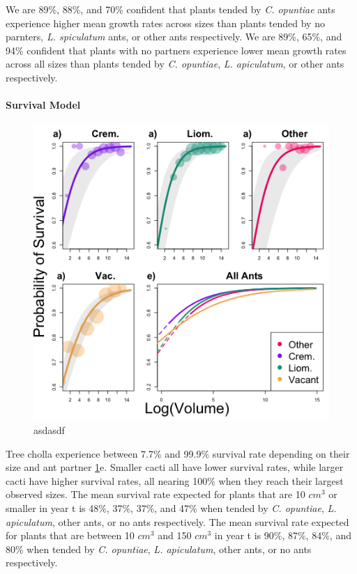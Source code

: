 \documentclass[11pt]{article}
\begin{document}
We are 89\%, 88\%, and 70\% confident that plants tended by \textit{C. opuntiae} ants experience higher mean growth rates across sizes than plants tended by no parnters, \textit{L. spiculatum} ants, or other ants respectively.
We are 89\%, 65\%, and 94\% confident that plants with no partners experience lower mean growth rates across all sizes than plants tended by \textit{C. opuntiae}, \textit{L. apiculatum}, or other ants respectively.

\paragraph{Survival Model}
\begin{figure}[H]
	\includegraphics[width=0.95\linewidth]{Figures/SurvivalPlot.png}
	\caption{asdasdf}
	\label{fig:surv}
\end{figure}
Tree cholla experience between 7.7\% and 99.9\% survival rate depending on their size and ant partner \ref{fig:surv}e.
Smaller cacti all have lower survival rates, while larger cacti have higher survival rates, all nearing 100\% when they reach their largest observed sizes.
The mean survival rate expected for plants that are 10 $cm^3$ or smaller in year t is 48\%, 37\%, 37\%, and 47\% when tended by \textit{C. opuntiae}, \textit{L. apiculatum}, other ants, or no ants respectively. 
The mean survival rate expected for plants that are between 10 $cm^3$ and 150 $cm^3$ in year t is 90\%, 87\%, 84\%, and 80\% when tended by \textit{C. opuntiae}, \textit{L. apiculatum}, other ants, or no ants respectively. 
\end{document}

